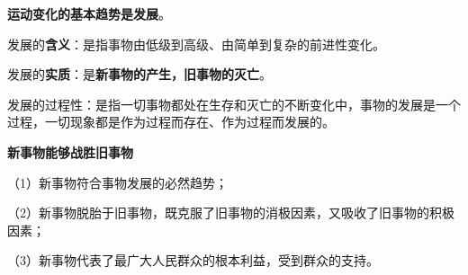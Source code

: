 \textbf{{运动变化的基本趋势是发展}}{。}

发展的\textbf{{含义}}：是指事物由低级到高级、由简单到复杂的前进性变化。

{发展的}\textbf{{实质}}{：是}\textbf{{新事物的产生，旧事物的灭亡}}{。}

{发展的过程性：是指一切事物都处在生存和灭亡的不断变化中，}事物的发展是一个过程，一切现象都是作为过程而存在、作为过程而发展的。

{\textbf{{新事物能够战胜旧事物}}}

（1）新事物符合事物发展的必然趋势；

（2）新事物脱胎于旧事物，既克服了旧事物的消极因素，又吸收了旧事物的积极因素；

（3）新事物代表了最广大人民群众的根本利益，受到群众的支持。
